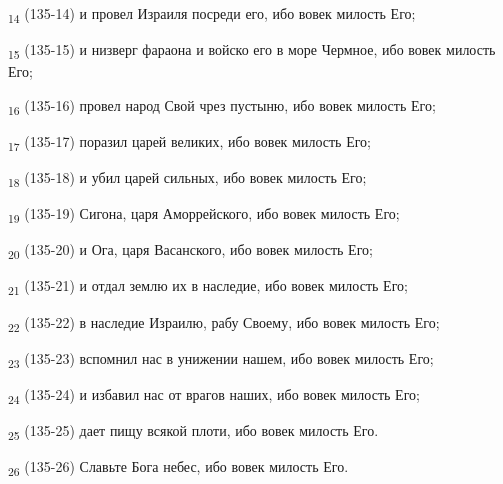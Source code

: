 \begin{tcolorbox}
\textsubscript{14} (135-14) и провел Израиля посреди его, ибо вовек милость Его;
\end{tcolorbox}
\begin{tcolorbox}
\textsubscript{15} (135-15) и низверг фараона и войско его в море Чермное, ибо вовек милость Его;
\end{tcolorbox}
\begin{tcolorbox}
\textsubscript{16} (135-16) провел народ Свой чрез пустыню, ибо вовек милость Его;
\end{tcolorbox}
\begin{tcolorbox}
\textsubscript{17} (135-17) поразил царей великих, ибо вовек милость Его;
\end{tcolorbox}
\begin{tcolorbox}
\textsubscript{18} (135-18) и убил царей сильных, ибо вовек милость Его;
\end{tcolorbox}
\begin{tcolorbox}
\textsubscript{19} (135-19) Сигона, царя Аморрейского, ибо вовек милость Его;
\end{tcolorbox}
\begin{tcolorbox}
\textsubscript{20} (135-20) и Ога, царя Васанского, ибо вовек милость Его;
\end{tcolorbox}
\begin{tcolorbox}
\textsubscript{21} (135-21) и отдал землю их в наследие, ибо вовек милость Его;
\end{tcolorbox}
\begin{tcolorbox}
\textsubscript{22} (135-22) в наследие Израилю, рабу Своему, ибо вовек милость Его;
\end{tcolorbox}
\begin{tcolorbox}
\textsubscript{23} (135-23) вспомнил нас в унижении нашем, ибо вовек милость Его;
\end{tcolorbox}
\begin{tcolorbox}
\textsubscript{24} (135-24) и избавил нас от врагов наших, ибо вовек милость Его;
\end{tcolorbox}
\begin{tcolorbox}
\textsubscript{25} (135-25) дает пищу всякой плоти, ибо вовек милость Его.
\end{tcolorbox}
\begin{tcolorbox}
\textsubscript{26} (135-26) Славьте Бога небес, ибо вовек милость Его.
\end{tcolorbox}

